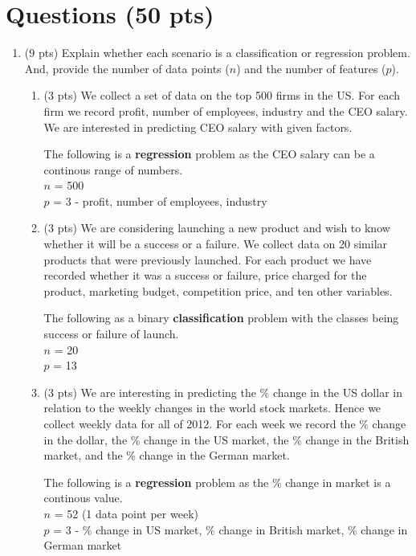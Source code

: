 \documentclass[a4paper]{article}
\theoremstyle{definition}
\newenvironment{soln}{
    \leavevmode\color{blue}\ignorespaces
}{}
\begin{document}
\section{Questions (50 pts)}
\begin{enumerate}
\item (9 pts) Explain whether each scenario is a classification or regression problem. And, provide the number of data points ($n$) and the number of features ($p$).

\begin{enumerate}
	\item (3 pts) We collect a set of data on the top 500 firms in the US. For each firm we record profit, number of employees, industry and the CEO salary. We are interested in predicting CEO salary with given factors.
	
	\begin{soln}
            The following is a \textbf{regression} problem as the CEO salary can be a continous range of numbers.\\
            $n$ = 500 \\
            $p$ = 3 - profit, number of employees, industry
        \end{soln}
	
	\item (3 pts) We are considering launching a new product and wish to know whether it will be a success or a failure. We collect data on 20 similar products that were previously launched. For each product we have recorded whether it was a success or failure, price charged for the product, marketing budget, competition price, and ten other variables.
	
	\begin{soln}
            The following as a binary \textbf{classification} problem with the classes being success or failure of launch.\\
            $n$ = 20 \\
            $p$ = 13
        \end{soln}
	
	\item (3 pts) We are interesting in predicting the \% change in the US dollar in relation to the weekly changes in the world stock markets. Hence we collect weekly data for all of 2012. For each week we record the \% change in the dollar, the \% change in the US market, the \% change in the British market, and the \% change in the German market.
	
	\begin{soln}
            The following is a \textbf{regression} problem as the \% change in market is a continous value.\\
            $n$ = 52 (1 data point per week)\\
            $p$ = 3 - \% change in US market, \% change in British market, \% change in German market
        \end{soln}
	

\end{enumerate}
\end{enumerate}
\end{document}
